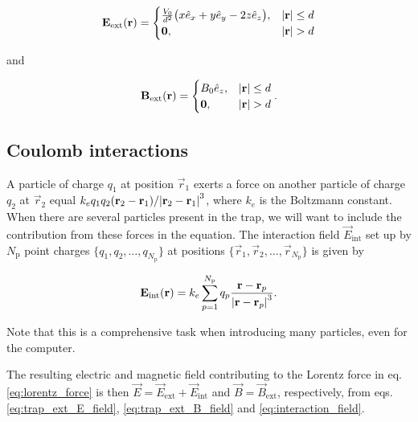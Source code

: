 \begin{equation}\label{eq:trap_ext_E_field}
    \mathbf{E}_\mathrm{ext} (\mathbf{r}) = 
    \begin{cases}
        \frac{V_0}{d^2} \big( x\hat{e}_x + y\hat{e}_y -2z\hat{e}_z \big), & \abs{\mathbf{r}} \leq d \\
        \mathbf{0},  & \abs{\mathbf{r}} > d
    \end{cases}
\end{equation}

and

\begin{equation}\label{eq:trap_ext_B_field}
    \mathbf{B}_\mathrm{ext} (\mathbf{r}) = 
    \begin{cases}
        B_0\hat{e}_z, & \abs{\mathbf{r}} \leq d \\
        \mathbf{0}, & \abs{\mathbf{r}} > d
    \end{cases}.
\end{equation}



\subsection{Coulomb interactions}

A particle of charge $q_1$ at position $\vec{r}_1$ exerts a force on another particle of charge $q_2$ at $\vec{r}_2$ equal $k_e q_1q_2 (\mathbf{r}_2-\mathbf{r}_1) / \abs{\mathbf{r}_2-\mathbf{r}_1}^3$, where $k_e$ is the Boltzmann constant. When there are several particles present in the trap, we will want to include the contribution from these forces in the equation. The interaction field $\vec{E}_\mathrm{int}$ set up by $N_\mathrm{p}$ point charges $\{q_1, q_2, \dots, q_{N_\mathrm{p}}\}$ at positions $\{\vec{r}_1, \vec{r}_2, \dots, \vec{r}_{N_\mathrm{p}}\}$ is given by

\begin{equation}\label{eq:interaction_field}
    \mathbf{E}_\mathrm{int} (\mathbf{r}) = k_e \sum_{p=1}^{N_\mathrm{p}} q_p \frac{\mathbf{r}-\mathbf{r}_p}{\abs{\mathbf{r}-\mathbf{r}_p}^3}.
\end{equation}

Note that this is a comprehensive task when introducing many particles, even for the computer. 

The resulting electric and magnetic field contributing to the Lorentz force in eq. \eqref{eq:lorentz_force} is then $\vec{E} = \vec{E}_\mathrm{ext} + \vec{E}_\mathrm{int}$ and $\vec{B} = \vec{B}_\mathrm{ext}$, respectively, from eqs. \eqref{eq:trap_ext_E_field}, \eqref{eq:trap_ext_B_field} and \eqref{eq:interaction_field}.




